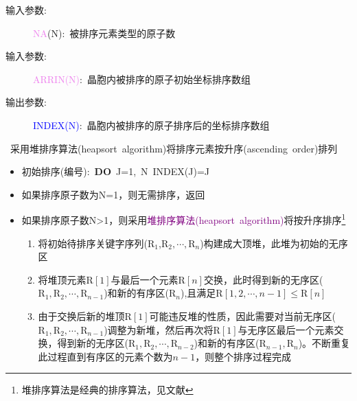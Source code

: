 \documentclass{article}      %
\begin{document}
\vskip 30pt
\begin{description}
	\item[输入参数:~] \textcolor{violet}{\textrm{NA}}(N):~被排序元素类型的原子数
	\item[输入参数:~] \textcolor{violet}{\textrm{ARRIN(N)}}:~晶胞内被排序的原子初始坐标排序数组
	\item[输出参数:~] \textcolor{blue}{\textrm{INDEX(N)}}:~晶胞内被排序的原子排序后的坐标排序数组
\end{description}
~采用堆排序算法(heapsort~algorithm)将排序元素按升序(ascending~order)排列
\begin{itemize}
	\item 初始排序(编号):~\textbf{DO}~\textrm{J}=1,~\textrm{N}~INDEX(J)=J
	\item 如果排序原子数为\textrm{N}=1，则无需排序，返回
	\item 如果排序原子数\textrm{N}>1，则采用\textcolor{purple}{堆排序算法(heapsort~algorithm)}将按升序排序\footnote{堆排序算法是经典的排序算法，见文献\cite{Numerical_Recipes}}
		\begin{enumerate}
			\item 将初始待排序关键字序列({$\mathrm{R}_1$,$\mathrm{R}_2,\cdots,\mathrm{R}_n$})构建成大顶堆，此堆为初始的无序区
			\item 将堆顶元素$\mathrm{R}[1]$与最后一个元素$\mathrm{R}[n]$交换，此时得到新的无序区(\textrm{$\mathrm{R}_1,\mathrm{R}_2,\cdots,\mathrm{R}_{n-1}$})和新的有序区($\mathrm{R}_n$),且满足$\mathrm{R}[1,2,\cdots,n-1]\leqslant\mathrm{R}[n]$
			\item 由于交换后新的堆顶$\mathrm{R}[1]$可能违反堆的性质，因此需要对当前无序区($\mathrm{R}_1,\mathrm{R}_2,\cdots,\mathrm{R}_{n-1}$)调整为新堆，然后再次将$\mathrm{R}[1]$与无序区最后一个元素交换，得到新的无序区($\mathrm{R}_1,\mathrm{R}_2,\cdots,\mathrm{R}_{n-2}$)和新的有序区($\mathrm{R}_{n-1},\mathrm{R}_n$)。不断重复此过程直到有序区的元素个数为$n-1$，则整个排序过程完成
		\end{enumerate}
\end{itemize}
\end{document}
